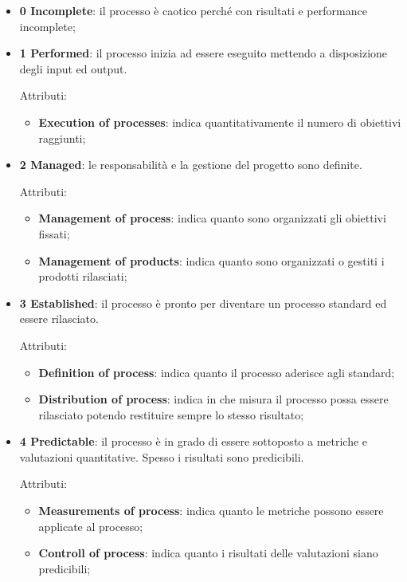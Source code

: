 	\begin{itemize}
		\item \textbf{0 Incomplete}: il processo è caotico perché con risultati e performance incomplete;
	
		\item \textbf{1 Performed}: il processo inizia ad essere eseguito mettendo a disposizione degli input ed output.
		
		Attributi:
		
		\begin{itemize}
			\item \textbf{Execution of processes}: indica quantitativamente il numero di obiettivi raggiunti;
		\end{itemize}
	
		\item \textbf{2 Managed}: le responsabilità e la gestione del progetto sono definite.
		
		Attributi:
		
		\begin{itemize}
			\item \textbf{Management of process}: indica quanto sono organizzati gli obiettivi fissati;
			\item \textbf{Management of products}: indica quanto sono organizzati o gestiti i prodotti rilasciati;
		\end{itemize}
	
		\item \textbf{3 Established}: il processo è pronto per diventare un processo standard ed essere rilasciato.
		
		Attributi:
		
		\begin{itemize}
			\item \textbf{Definition of process}: indica quanto il processo aderisce agli standard;
			\item \textbf{Distribution of process}: indica in che misura il processo possa essere rilasciato potendo restituire sempre lo stesso risultato;
		\end{itemize}
	
		\item \textbf{4 Predictable}: il processo è in grado di essere sottoposto a metriche e valutazioni quantitative. Spesso i risultati sono predicibili.
		
		Attributi:
		
		\begin{itemize}
			\item \textbf{Measurements of process}: indica quanto le metriche possono essere applicate al processo;
			\item \textbf{Controll of process}: indica quanto i risultati delle valutazioni siano predicibili;
		\end{itemize}
	

\end{itemize}
